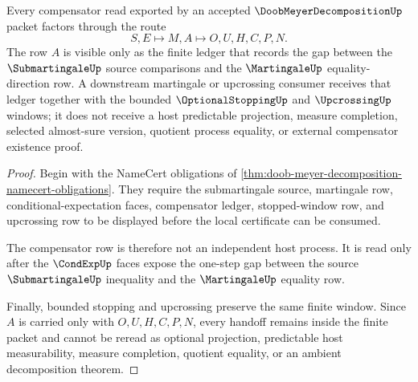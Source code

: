 \begin{theorem}
\label{thm:doob-meyer-decomposition-compensator-handoff}
Every compensator read exported by an accepted $\DoobMeyerDecompositionUp$ packet factors through the route
$$
S,E \longmapsto M,A \longmapsto O,U,H,C,P,N .
$$
The row $A$ is visible only as the finite ledger that records the gap between the $\SubmartingaleUp$ source comparisons and the $\MartingaleUp$ equality-direction row. A downstream martingale or upcrossing consumer receives that ledger together with the bounded $\OptionalStoppingUp$ and $\UpcrossingUp$ windows; it does not receive a host predictable projection, measure completion, selected almost-sure version, quotient process equality, or external compensator existence proof.
\end{theorem}
\begin{proof}
Begin with the NameCert obligations of \autoref{thm:doob-meyer-decomposition-namecert-obligations}. They require the submartingale source, martingale row, conditional-expectation faces, compensator ledger, stopped-window row, and upcrossing row to be displayed before the local certificate can be consumed.

The compensator row is therefore not an independent host process. It is read only after the $\CondExpUp$ faces expose the one-step gap between the source $\SubmartingaleUp$ inequality and the $\MartingaleUp$ equality row.

Finally, bounded stopping and upcrossing preserve the same finite window. Since $A$ is carried only with $O,U,H,C,P,N$, every handoff remains inside the finite packet and cannot be reread as optional projection, predictable host measurability, measure completion, quotient equality, or an ambient decomposition theorem.
\end{proof}



